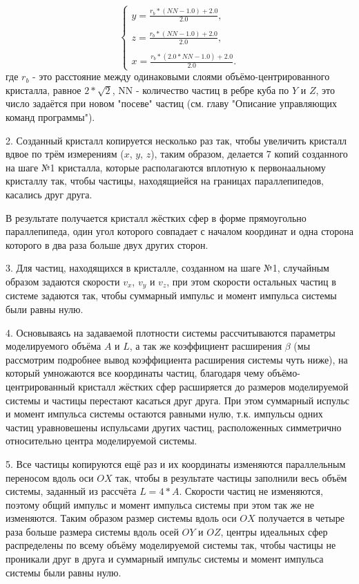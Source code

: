 \documentclass{article}
\begin{document}
\begin{equation}\label{eq:r_scalar}
    \begin{cases}
        y = \displaystyle\frac{r_b * (NN - 1.0) + 2.0}{2.0},
        \\
        \\
        z = \displaystyle\frac{r_b * (NN - 1.0) + 2.0}{2.0},
        \\
        \\
        x = \displaystyle\frac{r_b * (2.0 * NN - 1.0) + 2.0}{2.0}.
    \end{cases}
\end{equation}
где $ r_b $ - это расстояние между одинаковыми слоями объёмо-центрированного кристалла, равное $ 2*\sqrt{2} $, NN - количество частиц в ребре куба по $ Y $ и $ Z $, это число задаётся при новом "посеве" частиц (см. главу "Описание управляющих команд программы").

2. Созданный кристалл копируется несколько раз так, чтобы увеличить кристалл вдвое по трём измерениям ($x$, $y$, $z$), таким образом, делается 7 копий созданного на шаге №1 кристалла, которые располагаются вплотную к первонаальному кристаллу так, чтобы частицы, находящиейся на границах параллепипедов, касались друг друга.

В результате получается кристалл жёстких сфер в форме прямоугольно параллепипеда, один угол которого совпадает с началом координат и одна сторона которого в два раза больше двух других сторон.

3. Для частиц, находящихся в кристалле, созданном на шаге №1, случайным образом задаются скорости $ v_x $, $ v_y $ и $ v_z $, при этом скорости остальных частиц в системе задаются так, чтобы суммарный импульс и момент импульса системы были равны нулю.

4. Основываясь на задаваемой плотности системы рассчитываются параметры моделируемого объёма $ A $ и $ L $, а так же коэффициент расширения $ \beta $ (мы рассмотрим подробнее вывод коэффициента расширения системы чуть ниже), на который умножаются все координаты частиц, благодаря чему объёмо-центрированный кристалл жёстких сфер расширяется до размеров моделируемой системы и частицы перестают касаться друг друга. При этом суммарный испульс и момент импульса системы остаются равными нулю, т.к. импульсы одних частиц уравновешены испульсами других частиц, расположенных симметрично относительно центра моделируемой системы.

5. Все частицы копируются ещё раз и их координаты изменяются параллельным переносом вдоль оси $ OX $ так, чтобы в результате частицы заполнили весь объём системы, заданный из рассчёта $ L = 4*A $. Скорости частиц не изменяются, поэтому общий импульс и момент импульса системы при этом так же не изменяются. Таким образом размер системы вдоль оси $ OX $ получается в четыре раза больше размера системы вдоль осей $ OY$ и $ OZ $, центры идеальных сфер распределены по всему объёму моделируемой системы так, чтобы частицы не проникали друг в друга и суммарный импульс системы и момент импульса системы были равны нулю.
\end{document}
